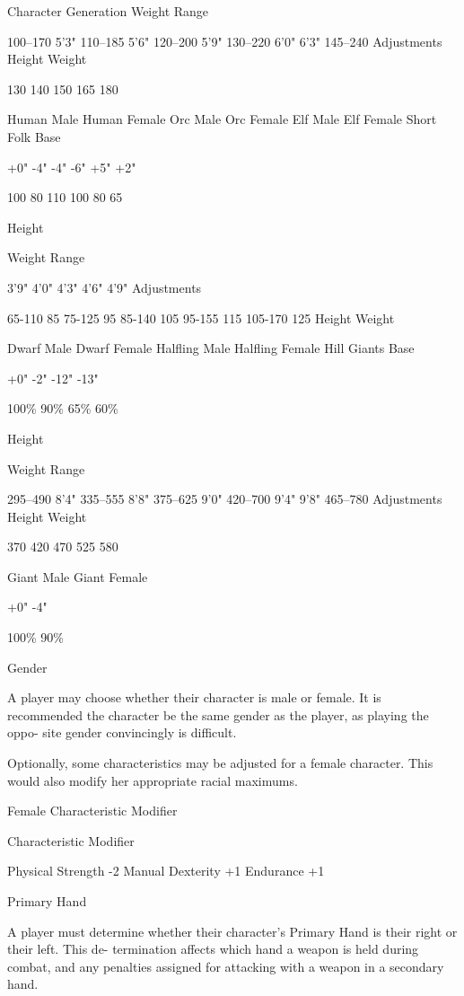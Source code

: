 \begin{Chapter}{Character Generation}
Weight   Range 

100–170 
5’3"  
110–185 
5’6"  
120–200 
5’9"  
130–220 
6’0"  
6’3"  
145–240 
Adjustments   Height   Weight 

130  
140  
150  
165  
180  

Human Male  
Human Female  
Orc Male  
Orc Female  
Elf Male  
Elf Female  
Short Folk Base 

+0"  
-4"  
-4"  
-6"  
+5"  
+2"  

100%
80%
110%
100%
80%
65%

Height  

Weight   Range 

3’9"  
4’0"  
4’3"  
4’6"  
4’9"  
Adjustments  

65-110 
85  
75-125 
95  
85-140 
105  
95-155 
115  
105-170 
125  
Height   Weight 

Dwarf Male  
Dwarf Female  
Halﬂing Male  
Halﬂing Female  
Hill Giants Base 

+0"  
-2"  
-12"  
-13"  

100\% 
90\% 
65\% 
60\%  

Height  

Weight   Range 

295–490 
8’4"  
335–555 
8’8"  
375–625 
9’0"  
420–700 
9’4"  
9’8"  
465–780 
Adjustments   Height   Weight 

370  
420  
470  
525  
580  

Giant Male  
Giant Female  

+0"  
-4"  

100\% 
90\% 

Gender 

A  player  may  choose  whether  their  character  is 
male or female. It is recommended the character be 
the same gender as the player, as playing the oppo-
site gender convincingly is difficult. 

Optionally,  some  characteristics  may  be  adjusted 
for a female character. This would also modify her 
appropriate racial maximums. 

Female Characteristic Modifier 

Characteristic   Modifier 

Physical Strength  
-2 
Manual Dexterity   +1 
Endurance  
+1 

Primary Hand 

A  player  must  determine  whether  their  character’s 
Primary  Hand  is  their  right  or  their  left.  This  de-
termination  affects  which  hand  a  weapon  is  held 
during  combat,  and  any  penalties  assigned  for 
attacking with a weapon in a secondary hand. 


\end{Chapter}
